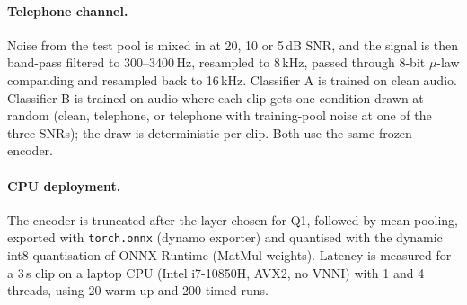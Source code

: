 \documentclass[11pt,a4paper]{article}
\begin{document}
\paragraph{Telephone channel.} Noise from the test pool is mixed in at 20, 10 or 5\,dB SNR, and
the signal is then band-pass filtered to 300--3400\,Hz, resampled to 8\,kHz, passed through 8-bit
$\mu$-law companding and resampled back to 16\,kHz. Classifier A is trained on clean audio.
Classifier B is trained on audio where each clip gets one condition drawn at random (clean,
telephone, or telephone with training-pool noise at one of the three SNRs); the draw is
deterministic per clip. Both use the same frozen encoder.

\paragraph{CPU deployment.} The encoder is truncated after the layer chosen for Q1, followed by
mean pooling, exported with \texttt{torch.onnx} (dynamo exporter) and quantised with the dynamic
int8 quantisation of ONNX Runtime (MatMul weights). Latency is measured for a 3\,s clip on a
laptop CPU (Intel i7-10850H, AVX2, no VNNI) with 1 and 4 threads, using 20 warm-up and 200 timed
runs.
\end{document}
